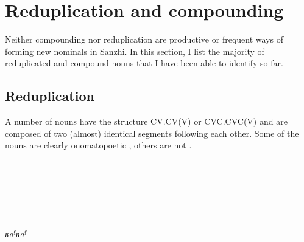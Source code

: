 
\section{Reduplication and compounding}
\label{sec:nounwordformation}
Neither compounding nor reduplication are productive or frequent ways of forming new nominals in Sanzhi. In this section, I list the majority of reduplicated and compound nouns that I have been able to identify so far. 


\subsection{Reduplication}
\label{ssec:Reduplication}

A number of nouns have the structure CV.CV(V) or CVC.CVC(V) and are composed of two (almost) identical segments following each other. Some of the nouns are clearly onomatopoetic , others are not .
%
\begin{exe}

	\ex	\label{ex:qːaˁqːaˁshook2}
		\TabPositions{15em,12em}
		 		\tab		{}  \\
		 			\tab		{}  \\
		 		\tab		{}  \\
					\tab		{} 
	
	\ex	\label{ex:qːaˁqːaˁshook}
		\TabPositions{15em,12em}
		 			\tab		{} \\
		 		\tab		{} \\
		\textit{ʁaˁʁaˁ} 
	
\end{exe}




